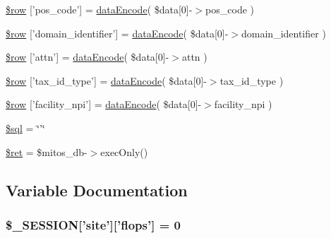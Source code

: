 \begin{DoxyCompactItemize}
\item 
\hyperlink{patientfile_2immnunization_2data__update_8ejs_8php_a356c4da2469428341dbff416200baee5}{\$row} \mbox{[}'pos\-\_\-code'\mbox{]} = \hyperlink{data_exchange_8class_8php_a18220e6e744fcb46d788ed8b03b85f62}{data\-Encode}( \$data\mbox{[}0\mbox{]}-\/$>$pos\-\_\-code )
\item 
\hyperlink{patientfile_2immnunization_2data__update_8ejs_8php_a1c503dc6be7e45d4cce60426e0dc6c16}{\$row} \mbox{[}'domain\-\_\-identifier'\mbox{]} = \hyperlink{data_exchange_8class_8php_a18220e6e744fcb46d788ed8b03b85f62}{data\-Encode}( \$data\mbox{[}0\mbox{]}-\/$>$domain\-\_\-identifier )
\item 
\hyperlink{patientfile_2immnunization_2data__update_8ejs_8php_af8886f39ae82fe4c6411bad1e0097c79}{\$row} \mbox{[}'attn'\mbox{]} = \hyperlink{data_exchange_8class_8php_a18220e6e744fcb46d788ed8b03b85f62}{data\-Encode}( \$data\mbox{[}0\mbox{]}-\/$>$attn )
\item 
\hyperlink{patientfile_2immnunization_2data__update_8ejs_8php_ad7a9a2a4679ba8036c5c2fa97dee89c4}{\$row} \mbox{[}'tax\-\_\-id\-\_\-type'\mbox{]} = \hyperlink{data_exchange_8class_8php_a18220e6e744fcb46d788ed8b03b85f62}{data\-Encode}( \$data\mbox{[}0\mbox{]}-\/$>$tax\-\_\-id\-\_\-type )
\item 
\hyperlink{patientfile_2immnunization_2data__update_8ejs_8php_abca371c5e770b60b9b3dacacf9877173}{\$row} \mbox{[}'facility\-\_\-npi'\mbox{]} = \hyperlink{data_exchange_8class_8php_a18220e6e744fcb46d788ed8b03b85f62}{data\-Encode}( \$data\mbox{[}0\mbox{]}-\/$>$facility\-\_\-npi )
\item 
\hyperlink{patientfile_2immnunization_2data__update_8ejs_8php_a047170d6020a882807665812a27e2525}{\$sql} = \char`\"{}'\char`\"{}
\item 
\hyperlink{patientfile_2immnunization_2data__update_8ejs_8php_affd9e3eb0aad0a7ca42912cd925f148c}{\$ret} = \$mitos\-\_\-db-\/$>$exec\-Only()
\end{DoxyCompactItemize}


\subsection{\-Variable \-Documentation}
\hypertarget{patientfile_2immnunization_2data__update_8ejs_8php_a99fda8552a3e58235643b79f5af3ded8}{
\subsubsection[{\$\-\_\-\-S\-E\-S\-S\-I\-O\-N}]{\setlength{\rightskip}{0pt plus 5cm}\$\-\_\-\-S\-E\-S\-S\-I\-O\-N\mbox{[}'site'\mbox{]}\mbox{[}'flops'\mbox{]} = 0}}\label{patientfile_2immnunization_2data__update_8ejs_8php_a99fda8552a3e58235643b79f5af3ded8}


